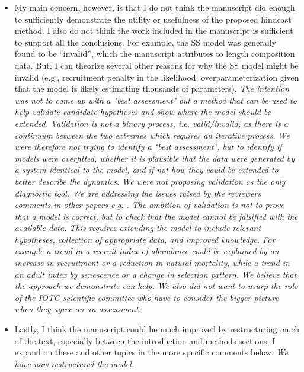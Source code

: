 \begin{itemize}
    \item My main concern, however, is that I do not think the manuscript did enough to sufficiently demonstrate the utility or usefulness of the proposed hindcast method. I also do not think the work included in the manuscript is sufficient to support all the conclusions. For example, the SS model was generally found to be “invalid”, which the manuscript attributes to length composition data. But, I can theorize several other reasons for why the SS model might be invalid (e.g., recruitment penalty in the likelihood, overparameterization given that the model is likely estimating thousands of parameters).
    \textit{\newline The intention was not to come up with a "best assessment" but a method that can be used to help validate candidate hypotheses and show where the model should be extended. 
    Validation is not a binary process, i.e. valid/invalid, as there is a continuum between the two extremes which requires an iterative process. We were therefore not trying to identify a "best assessment", but to identify if models were overfitted,  whether it is plausible that the data were generated by a system identical to the model, and if not how they could be extended to better describe the dynamics. We were not proposing validation as the only diagnostic tool.  We are addressing the issues raised by the reviewers comments in other papers e.g. \cite{carvalho2020cookbook}. The ambition of validation is not to prove that a model is correct, but to check that the model cannot be falsified with the available data. This requires extending the model to include relevant hypotheses, collection of appropriate data, and improved knowledge.   For example a trend in a recruit index of abundance could be explained by an increase in recruitment or a reduction in natural mortality, while a trend in an adult index by senescence or a change in selection pattern. We believe that the approach we demonstrate can help. We also did not want to usurp the role of the IOTC scientific committee who have to consider the bigger picture when they agree on an assessment.}

    \item Lastly, I think the manuscript could be much improved by restructuring much of the text, especially between the introduction and methods sections. I expand on these and other topics in the more specific comments below.
    \textit{\newline We have now restructured the model.}


\end{itemize}
